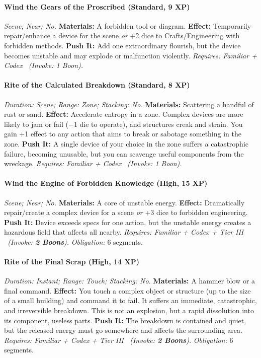 \paragraph{Wind the Gears of the Proscribed (Standard, 9 XP)} \emph{Scene; Near; No.}
\textbf{Materials:} A forbidden tool or diagram.
\textbf{Effect:} Temporarily repair/enhance a device for the scene \emph{or} +2 dice to Crafts/Engineering with forbidden methods.
\textbf{Push It:} Add one extraordinary flourish, but the device becomes unstable and may explode or malfunction violently.
\emph{Requires: Familiar + Codex \ (\textit{Invoke:} 1 Boon).}
\paragraph{Rite of the Calculated Breakdown (Standard, 8 XP)} \emph{Duration: Scene; Range: Zone; Stacking: No.}
\textbf{Materials:} Scattering a handful of rust or sand.
\textbf{Effect:} Accelerate entropy in a zone. Complex devices are more likely to jam or fail (−1 die to operate), and structures creak and strain. You gain +1 effect to any action that aims to break or sabotage something in the zone.
\textbf{Push It:} A single device of your choice in the zone suffers a catastrophic failure, becoming unusable, but you can scavenge useful components from the wreckage.
\emph{Requires: Familiar + Codex \ (\textit{Invoke:} 1 Boon).}
\paragraph{Wind the Engine of Forbidden Knowledge (High, 15 XP)} \emph{Scene; Near; No.}
\textbf{Materials:} A core of unstable energy.
\textbf{Effect:} Dramatically repair/create a complex device for a scene \emph{or} +3 dice to forbidden engineering.
\textbf{Push It:} Device exceeds specs for one action, but the unstable energy creates a hazardous field that affects all nearby.
\emph{Requires: Familiar + Codex + Tier III \ (\textit{Invoke:} \textbf{2 Boons}).}
\emph{Obligation:} 6 segments.

\paragraph{Rite of the Final Scrap (High, 14 XP)} \emph{Duration: Instant; Range: Touch; Stacking: No.}
\textbf{Materials:} A hammer blow or a final command.
\textbf{Effect:} You touch a complex object or structure (up to the size of a small building) and command it to fail. It suffers an immediate, catastrophic, and irreversible breakdown. This is not an explosion, but a rapid dissolution into its component, useless parts.
\textbf{Push It:} The breakdown is contained and quiet, but the released energy must go somewhere and affects the surrounding area.
\emph{Requires: Familiar + Codex + Tier III \ (\textit{Invoke:} \textbf{2 Boons}).}
\emph{Obligation:} 6 segments.

